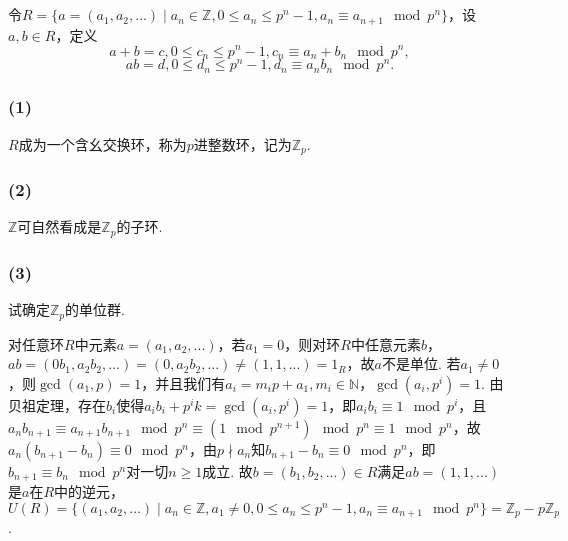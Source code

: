\subsection{}
令$R=\{a=(a_1,a_2,...)\mid a_n\in \mathbb{Z},0\leq a_n\leq p^n-1,a_n\equiv a_{n+1}\mod p^n\}$，设$a,b\in R$，定义
$$a+b=c,0\leq c_n\leq p^n-1, c_n\equiv a_n+b_n\mod p^n,$$
$$ab=d,0\leq d_n\leq p^n-1, d_n\equiv a_nb_n\mod p^n.$$
\subsubsection{(1)}
$R$成为一个含幺交换环，称为$p$进整数环，记为$\mathbb{Z}_p$.

\subsubsection{(2)}
$\mathbb{Z}$可自然看成是$\mathbb{Z}_p$的子环.

\subsubsection{(3)}
试确定$\mathbb{Z}_p$的单位群.

\jie 对任意环$R$中元素$a=(a_1,a_2,...)$，若$a_1=0$，则对环$R$中任意元素$b$，$ab=(0b_1, a_2b_2,...)=(0,a_2b_2,...)\neq(1,1,...)=1_R$，故$a$不是单位. 若$a_1\neq 0$，则$\gcd(a_1,p)=1$，并且我们有$a_i=m_ip+a_1, m_i\in\mathbb{N}$，$\gcd(a_i,p^i)=1$. 由贝祖定理，存在$b_i$使得$a_ib_i+p^ik=\gcd(a_i,p^i)=1$，即$a_ib_i\equiv 1\mod p^i$，且$a_nb_{n+1}\equiv a_{n+1}b_{n+1}\mod p^n\equiv (1\mod p^{n+1})\mod p^n\equiv 1\mod p^n$，故$a_n(b_{n+1}-b_n)\equiv 0\mod p^n$，由$p\nmid a_n$知$b_{n+1}-b_n\equiv 0\mod p^n$，即$b_{n+1}\equiv b_n\mod p^n$对一切$n\geq 1$成立. 故$b=(b_1,b_2,...)\in R$满足$ab=(1,1,...)$是$a$在$R$中的逆元，$U(R)=\{(a_1,a_2,...)\mid a_n\in\mathbb{Z}, a_1\neq 0, 0\leq a_n\leq p^n-1,a_n\equiv a_{n+1}\mod p^n\}=\mathbb{Z}_p-p\mathbb{Z}_p$.

